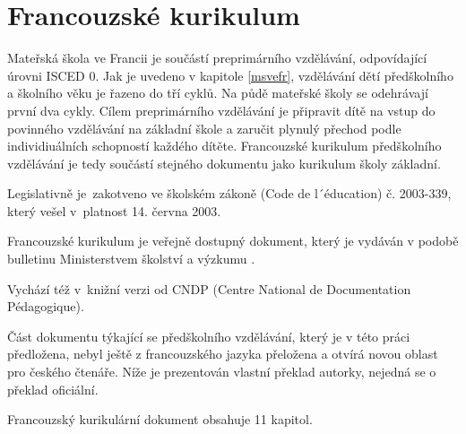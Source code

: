 	\section{Francouzské kurikulum}
	\label{frkurikulum}

		Mateřská škola ve Francii je součástí preprimárního vzdělávání, odpovídající úrovni ISCED 0. Jak je uvedeno v kapitole \ref{msvefr}, vzdělávání dětí předškolního a školního věku je řazeno do tří cyklů. Na půdě mateřské školy se odehrávají první dva cykly. Cílem preprimárního vzdělávání je připravit dítě na vstup do povinného vzdělávání na základní škole a  zaručit plynulý přechod podle individiuálních schopností každého dítěte. Francouzské kurikulum předškolního vzdělávání je tedy součástí stejného dokumentu jako kurikulum školy základní. 

		Legislativně je zakotveno ve školském zákoně (Code de l´éducation) č. 2003-339, který vešel v platnost 14. června 2003.
	
		Francouzské kurikulum je veřejně dostupný dokument, který je vydáván v podobě bulletinu Ministerstvem školství a výzkumu \citep{buletin}.

		Vychází též v knižní verzi od CNDP (Centre National de Documentation Pédagogique)\citep{CNDP}.

		Část dokumentu týkající se předškolního vzdělávání, který je v této práci předložena, nebyl ještě z francouzského jazyka přeložena a otvírá novou oblast pro českého čtenáře. Níže je prezentován vlastní překlad autorky, nejedná se o překlad oficiální. 

		Francouzský kurikulární dokument obsahuje 11 kapitol. 

